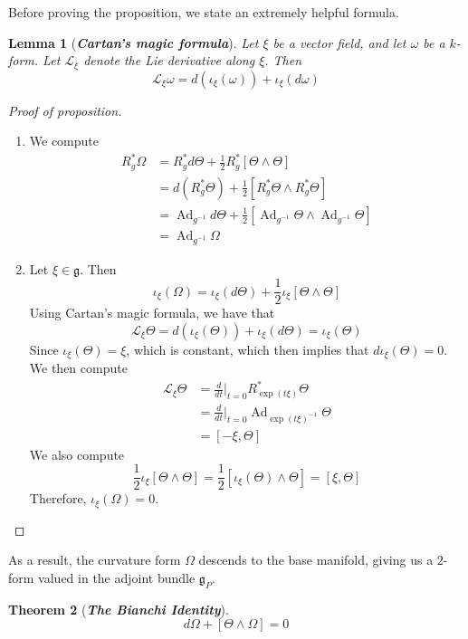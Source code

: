 \documentclass[psamsfonts, 12pt]{amsart}
\newtheorem{thm}{Theorem}[section]
\newtheorem{lem}[thm]{Lemma}
\theoremstyle{definition}
\theoremstyle{remark}
\newcommand{\ib}[1]{\textbf{\textit{#1}}}
\newcommand{\g}{\mathfrak{g}}
\newcommand{\inv}{^{-1}}
\newcommand{\enumbreak}{\ \\ \vspace{-\baselineskip}}
\DeclareMathOperator{\Ad}{Ad}
\begin{document}
%
Before proving the proposition, we state an extremely helpful formula.
%
\begin{lem}[\ib{Cartan's magic formula}]
Let $\xi$ be a vector field, and let $\omega$ be a $k$-form. Let $\mathcal{L}_\xi$
denote the Lie derivative along $\xi$. Then
\[
\mathcal{L}_\xi\omega = d(\iota_\xi(\omega)) + \iota_\xi(d\omega)
\]
\end{lem}
%
\begin{proof}[Proof of proposition] \enumbreak
\begin{enumerate}
  \item We compute
  \begin{align*}
  R_g^*\Omega &= R_g^*d\Theta + \frac{1}{2}R_g^*[\Theta \wedge \Theta] \\
  &= d(R_g^*\Theta) + \frac{1}{2}[R_g^*\Theta\wedge R_g^*\Theta] \\
  &= \Ad_{g\inv}d\Theta + \frac{1}{2}[\Ad_{g\inv}\Theta \wedge \Ad_{g\inv}\Theta] \\
  & = \Ad_{g\inv}\Omega
  \end{align*}
  \item Let $\xi \in \g$. Then
  \[
  \iota_{\xi}(\Omega) = \iota_\xi(d\Theta) + \frac{1}{2}\iota_\xi[\Theta \wedge \Theta]
  \]
  Using Cartan's magic formula, we have that
  \[
  \mathcal{L}_\xi\Theta = d(\iota_\xi(\Theta)) + \iota_\xi(d\Theta) = \iota_\xi(\Theta)
  \]
  Since $\iota_\xi(\Theta) = \xi$, which is constant, which then implies that
  $d\iota_\xi(\Theta) = 0$. We then compute
  \begin{align*}
  \mathcal{L}_\xi\Theta &= \frac{d}{dt}\bigg\vert_{t=0}R^*_{\exp(t\xi)}\Theta \\
  &= \frac{d}{dt}\bigg\vert_{t=0}\Ad_{\exp(t\xi)\inv}\Theta \\
  &= [-\xi,\Theta]
  \end{align*}
  We also compute
  \[
  \frac{1}{2}\iota_\xi[\Theta\wedge\Theta] = \frac{1}{2}[\iota_\xi(\Theta) \wedge \Theta]
  = [\xi,\Theta]
  \]
  Therefore, $\iota_\xi(\Omega) = 0$.
\end{enumerate}
\end{proof}
%
As a result, the curvature form $\Omega$ descends to the base manifold, giving
us a $2$-form valued in the adjoint bundle $\g_P$.
%
\begin{thm}[\ib{The Bianchi Identity}]
\[
d\Omega + [\Theta\wedge\Omega] = 0
\]
\end{thm}
%
\end{document}
